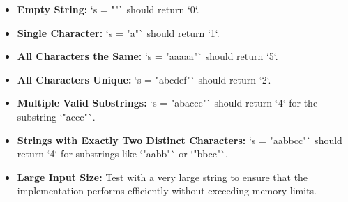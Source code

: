 \begin{itemize}
    \item \textbf{Empty String:} `s = ""` should return `0`.
    
    \item \textbf{Single Character:} `s = "a"` should return `1`.
    
    \item \textbf{All Characters the Same:} `s = "aaaaa"` should return `5`.
    
    \item \textbf{All Characters Unique:} `s = "abcdef"` should return `2`.
    
    \item \textbf{Multiple Valid Substrings:} `s = "abaccc"` should return `4` for the substring `"accc"`.
    
    \item \textbf{Strings with Exactly Two Distinct Characters:} `s = "aabbcc"` should return `4` for substrings like `"aabb"` or `"bbcc"`.
    
    \item \textbf{Large Input Size:} Test with a very large string to ensure that the implementation performs efficiently without exceeding memory limits.
\end{itemize}

\printindex